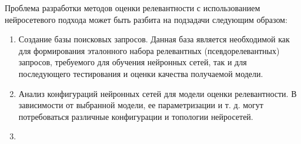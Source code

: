 Проблема разработки методов оценки релевантности с использованием нейросетевого подхода может быть
разбита на подзадачи следующим образом:
\begin{enumerate}[1)]
    \item Создание базы поисковых запросов. Данная база является необходимой как для формирования эталонного
    набора релевантных (псевдорелевантных) запросов, требуемого для обучения нейронных сетей, так и для последующего
    тестирования и оценки качества получаемой модели.
    \item Анализ конфигураций нейронных сетей для модели оценки релевантности. В зависимости от выбранной модели,
    ее параметризации и т. д. могут потребоваться различные конфигурации и топологии нейросетей. 
    \item 
\end{enumerate}